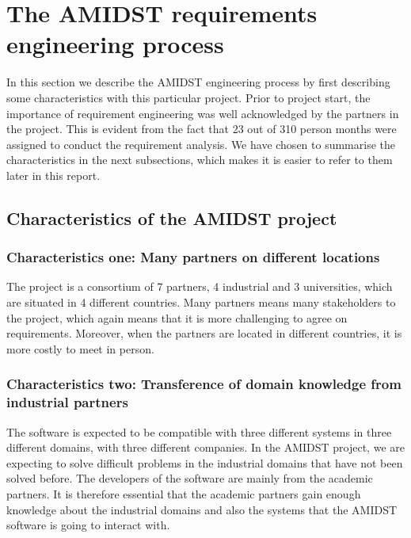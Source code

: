 \documentclass[11pt, oneside]{article}   	%
\begin{document}
\section{The AMIDST requirements engineering process}
\label{sec:AmidstRequirementProcess}

In this section we describe the AMIDST engineering process by first describing some characteristics with this particular project.  Prior to project start, the importance of requirement engineering was well acknowledged by the partners in the project.  This is evident from the fact that 23 out of 310 person months were assigned to conduct the requirement analysis.  We have chosen to summarise the characteristics in the next subsections, which makes it is easier to refer to them later in this report.

\subsection{Characteristics of the AMIDST project}
\label{sec:characteristics}

\subsubsection{Characteristics one: Many partners on different locations}
\label{sec:characteristic1}
The project is a consortium of 7 partners, 4 industrial and 3 universities, which are situated in 4 different countries.  Many partners means many stakeholders to the project, which again means that it is more challenging to agree on requirements.  Moreover, when the partners are located in different countries, it is more costly to meet in person.

\subsubsection{Characteristics two: Transference of domain knowledge from industrial partners}
\label{sec:characteristic2}
The software is expected to be compatible with three different systems in three different domains, with three different companies.  In the AMIDST project, we are expecting to solve difficult problems in the industrial domains that have not been solved before.  The developers of the software are mainly from the academic partners.  It is therefore essential that the academic partners gain enough knowledge about the industrial domains and also the systems that the AMIDST software is going to interact with. 
\end{document}
